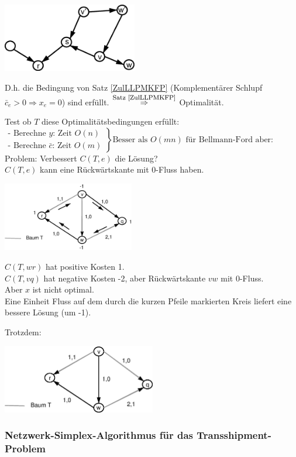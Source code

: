 \includegraphics[height=3cm]{bilder/4-2NetzSimpl3}

D.h. die Bedingung von Satz \ref{ZulLLPMKFP} (Komplementärer Schlupf
$\bar{c}_{e} > 0 \Rightarrow x_{e} = 0$) sind erfüllt.
$\stackrel{\mbox{\footnotesize Satz \ref{ZulLLPMKFP}}}{\Rightarrow}$ Optimalität.

Test ob $T$ diese Optimalitätsbedingungen erfüllt:\\
$\left.\begin{array}{l}
\mbox{- Berechne $y$: Zeit $O(n)$}\\
\mbox{- Berechne $\bar{c}$: Zeit $O(m)$}\end{array} \right\}
\mbox{Besser als $O(m n)$ für Bellmann-Ford aber:}$\\
Problem: Verbessert $C(T,e)$ die Lösung?\\
$C(T,e)$ kann eine Rückwärtskante mit 0-Fluss haben.

\includegraphics[height=3cm]{bilder/4-2NetzSimpl4}

$C(T,w r)$ hat positive Kosten 1.\\
$C(T, v q)$ hat negative Kosten -2, aber Rückwärtskante $v w $ mit
0-Fluss.\\ Aber $x$ ist nicht optimal.\\
Eine Einheit Fluss auf dem durch die kurzen Pfeile markierten Kreis liefert
eine bessere Lösung (um -1).

Trotzdem:

\includegraphics[height=3cm]{bilder/4-2NetzSimpl5}


\subsubsection{Netzwerk-Simplex-Algorithmus für das 
Transshipment-Problem}

